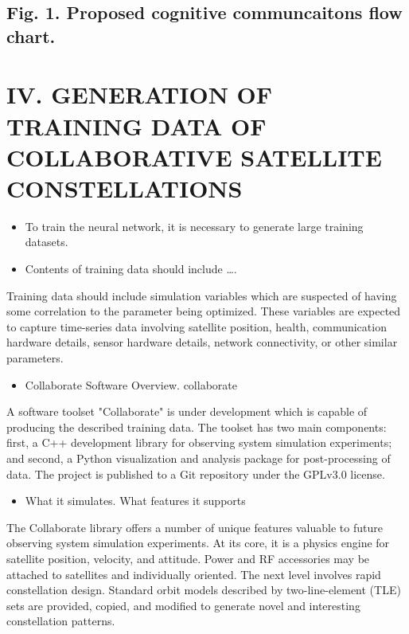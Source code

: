 \documentclass[11pt]{article}
\begin{document}
\subsection*{Fig. 1. Proposed cognitive communcaitons flow chart.}
\label{sec:org570f9f3}

\section*{IV. GENERATION OF TRAINING DATA OF COLLABORATIVE SATELLITE CONSTELLATIONS}
\label{sec:org1beb0a1}

\begin{itemize}
\item To train the neural network, it is necessary to generate large training
datasets.

\item Contents of training data should include \ldots{}.
\end{itemize}

Training data should include simulation variables which are suspected of having
some correlation to the parameter being optimized.  These variables are expected
to capture time-series data involving satellite position, health, communication
hardware details, sensor hardware details, network connectivity, or other
similar parameters.

\begin{itemize}
\item Collaborate Software Overview.  collaborate
\end{itemize}
A software toolset "Collaborate" is under development which is capable of
producing the described training data.  The toolset has two main components:
first, a C++ development library for observing system simulation experiments;
and second, a Python visualization and analysis package for post-processing of
data.  The project is published to a Git repository under the GPLv3.0 license.

\begin{itemize}
\item What it simulates. What features it supports
\end{itemize}
The Collaborate library offers a number of unique features valuable to future
observing system simulation experiments.  At its core, it is a physics engine
for satellite position, velocity, and attitude.  Power and RF accessories may be
attached to satellites and individually oriented.  The next level involves rapid
constellation design.  Standard orbit models described by two-line-element (TLE)
sets are provided, copied, and modified to generate novel and interesting
constellation patterns.
\end{document}
